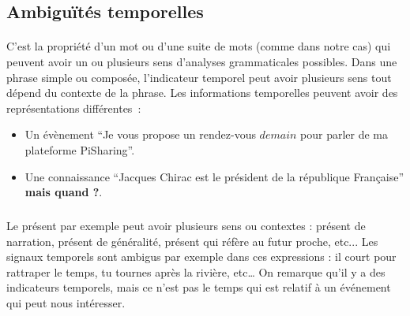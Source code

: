 \subsection{Ambiguïtés temporelles}
\paragraph{}
C'est la propriété d'un mot ou d'une suite de mots (comme dans notre cas) qui peuvent avoir un ou plusieurs sens d'analyses grammaticales possibles. Dans une phrase simple ou composée, l'indicateur temporel peut avoir plusieurs sens tout dépend du contexte de la phrase. Les informations temporelles peuvent avoir des représentations différentes~: 
\begin{itemize}
\item Un évènement ``Je vous propose un rendez-vous $demain$ pour parler de ma plateforme PiSharing''. \item Une connaissance ``Jacques Chirac est le président de la république Française'' \textbf{ mais quand ?}.
\end{itemize}

\subparagraph{} 
Le présent par exemple peut avoir plusieurs sens ou contextes : présent de narration, présent de généralité, présent qui réfère au futur proche, etc...
Les signaux temporels sont ambigus par exemple dans ces expressions : il court pour rattraper le temps, tu tournes après la rivière, etc… On remarque qu'il y a des indicateurs temporels, mais ce n'est pas le temps qui est relatif à un événement qui peut nous intéresser.
